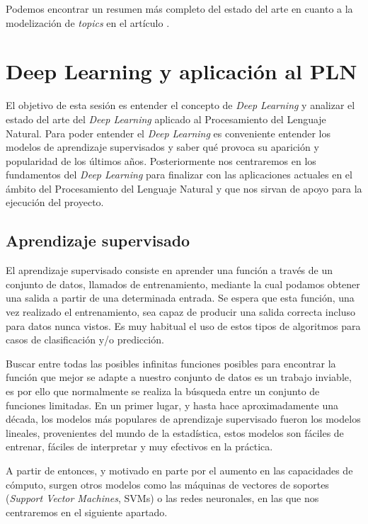 Podemos encontrar un resumen más completo del estado del arte en cuanto a la modelización de \textit{topics} en el artículo \cite{Mahmood2013LiteratureSO}. 

\section{Deep Learning  y aplicación al PLN}
\label{section:arte:deep}

El objetivo de esta sesión es entender el concepto de \textit{Deep Learning} y analizar el estado del arte del \textit{Deep Learning} aplicado al Procesamiento del Lenguaje Natural. Para poder entender el \textit{Deep Learning} es conveniente entender los modelos de aprendizaje supervisados y saber qué provoca su aparición y popularidad de los últimos años. Posteriormente nos centraremos en los fundamentos del \textit{Deep Learning} para finalizar con las aplicaciones actuales en el ámbito del Procesamiento del Lenguaje Natural y que nos sirvan de apoyo para la ejecución del proyecto.


\subsection{Aprendizaje supervisado}
El aprendizaje supervisado consiste en aprender una función a través de un conjunto de datos, llamados de entrenamiento, mediante la cual podamos obtener una salida a partir de una determinada entrada. Se espera que esta función, una vez realizado el entrenamiento, sea capaz de producir una salida correcta incluso para datos nunca vistos. Es muy habitual el uso de estos tipos de algoritmos para casos de clasificación y/o predicción. 

Buscar entre todas las posibles infinitas funciones posibles para encontrar la función que mejor se adapte a nuestro conjunto de datos es un trabajo inviable, es por ello que normalmente se realiza la búsqueda entre un conjunto de funciones limitadas. En un primer lugar, y hasta hace aproximadamente una década, los modelos más populares de aprendizaje supervisado fueron los modelos lineales, provenientes del mundo de la estadística, estos modelos son fáciles de entrenar, fáciles de interpretar y muy efectivos en la práctica. 

A partir de entonces, y motivado en parte por el aumento en las capacidades de cómputo, surgen otros modelos como las máquinas de vectores de soportes (\textit{Support Vector Machines}, SVMs) o las redes neuronales, en las que nos centraremos en el siguiente apartado.


